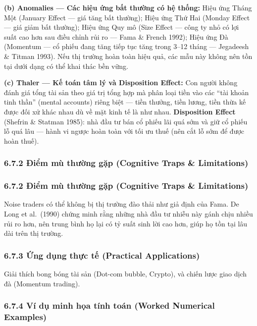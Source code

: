 \documentclass[
]{article}
\begin{document}
\textbf{(b) Anomalies --- Các hiệu ứng bất thường có hệ thống:} Hiệu ứng
Tháng Một (January Effect --- giá tăng bất thường); Hiệu ứng Thứ Hai
(Monday Effect --- giá giảm bất thường); Hiệu ứng Quy mô (Size Effect
--- công ty nhỏ có lợi suất cao hơn sau điều chỉnh rủi ro --- Fama \&
French 1992); Hiệu ứng Đà (Momentum --- cổ phiếu đang tăng tiếp tục tăng
trong 3--12 tháng --- Jegadeesh \& Titman 1993). Nếu thị trường hoàn
toàn hiệu quả, các mẫu này không nên tồn tại dưới dạng có thể khai thác
bền vững.

\textbf{(c) Thaler --- Kế toán tâm lý và Disposition Effect:} Con người
không đánh giá tổng tài sản theo giá trị tổng hợp mà phân loại tiền vào
các ``tài khoản tinh thần'' (mental accounts) riêng biệt --- tiền
thưởng, tiền lương, tiền thừa kế được đối xử khác nhau dù về mặt kinh tế
là như nhau. \textbf{Disposition Effect} (Shefrin \& Statman 1985): nhà
đầu tư bán cổ phiếu lãi quá sớm và giữ cổ phiếu lỗ quá lâu --- hành vi
ngược hoàn toàn với tối ưu thuế (nên cắt lỗ sớm để được hoàn thuế).

\subsubsection{6.7.2 Điểm mù thường gặp (Cognitive Traps \&
Limitations)}\label{ux111iux1ec3m-muxf9-thux1b0ux1eddng-gux1eb7p-cognitive-traps-limitations-27}

\subsubsection{6.7.2 Điểm mù thường gặp (Cognitive Traps \&
Limitations)}\label{ux111iux1ec3m-muxf9-thux1b0ux1eddng-gux1eb7p-cognitive-traps-limitations-28}

Noise traders có thể không bị thị trường đào thải như giả định của Fama.
De Long et al.~(1990) chứng minh rằng những nhà đầu tư nhiễu này gánh
chịu nhiều rủi ro hơn, nên trung bình họ lại có tỷ suất sinh lời cao
hơn, giúp họ tồn tại lâu dài trên thị trường.

\subsubsection{6.7.3 Ứng dụng thực tế (Practical
Applications)}\label{ux1ee9ng-dux1ee5ng-thux1ef1c-tux1ebf-practical-applications-15}

Giải thích bong bóng tài sản (Dot-com bubble, Crypto), và chiến lược
giao dịch đà (Momentum trading).

\subsubsection{6.7.4 Ví dụ minh họa tính toán (Worked Numerical
Examples)}\label{vuxed-dux1ee5-minh-hux1ecda-tuxednh-touxe1n-worked-numerical-examples-14}
\end{document}
